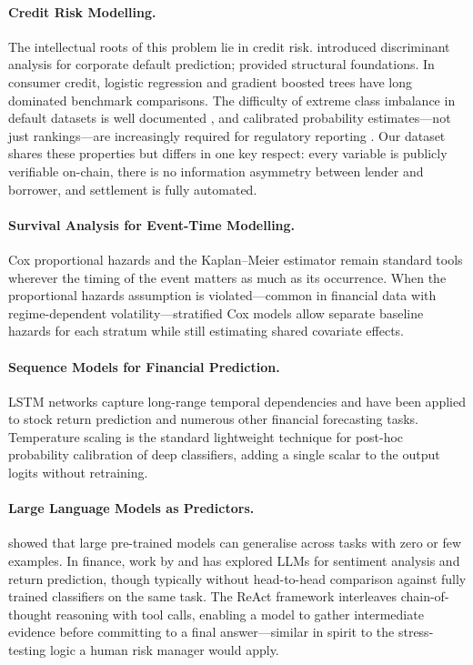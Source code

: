 \documentclass[12pt,a4paper]{article}
\begin{document}
\paragraph{Credit Risk Modelling.}
The intellectual roots of this problem lie in credit risk.
\citet{altman1968financial} introduced discriminant analysis for corporate
default prediction; \citet{merton1974pricing} provided structural foundations.
In consumer credit, logistic regression \citep{thomas2002credit} and gradient
boosted trees \citep{lessmann2015benchmarking} have long dominated benchmark
comparisons.  The difficulty of extreme class imbalance in default datasets
is well documented \citep{he2009learning}, and calibrated probability
estimates---not just rankings---are increasingly required for regulatory
reporting \citep{platt1999probabilistic}.  Our dataset shares these properties
but differs in one key respect: every variable is publicly verifiable on-chain,
there is no information asymmetry between lender and borrower, and settlement
is fully automated.

\paragraph{Survival Analysis for Event-Time Modelling.}
Cox proportional hazards \citep{cox1972regression} and the Kaplan--Meier
estimator \citep{kaplan1958nonparametric} remain standard tools wherever the
timing of the event matters as much as its occurrence.  When the proportional
hazards assumption is violated---common in financial data with
regime-dependent volatility---stratified Cox models \citep{klein2003survival}
allow separate baseline hazards for each stratum while still estimating
shared covariate effects.

\paragraph{Sequence Models for Financial Prediction.}
LSTM networks \citep{hochreiter1997long} capture long-range temporal
dependencies and have been applied to stock return prediction
\citep{fischer2018deep} and numerous other financial forecasting tasks.
Temperature scaling \citep{guo2017calibration} is the standard lightweight
technique for post-hoc probability calibration of deep classifiers, adding
a single scalar to the output logits without retraining.

\paragraph{Large Language Models as Predictors.}
\citet{brown2020language} showed that large pre-trained models can generalise
across tasks with zero or few examples.  In finance, work by
\citet{yang2023fingpt} and \citet{lopez2023can} has explored LLMs for
sentiment analysis and return prediction, though typically without
head-to-head comparison against fully trained classifiers on the same task.
The ReAct framework \citep{yao2022react} interleaves chain-of-thought
reasoning with tool calls, enabling a model to gather intermediate evidence
before committing to a final answer---similar in spirit to the stress-testing
logic a human risk manager would apply.
\end{document}
